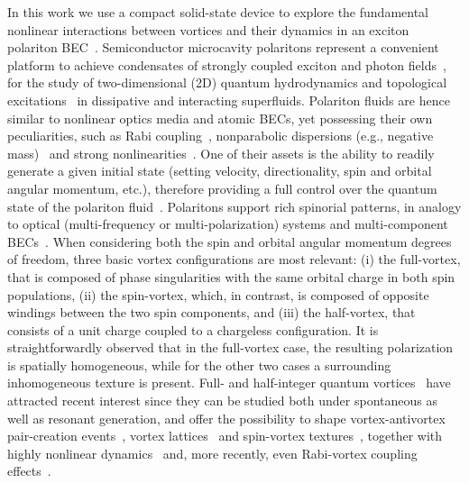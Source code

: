 \documentclass[aps,prb,twocolumn,superscriptaddress,nofootinbib]{revtex4}
\def\editr#1{#1}
\def\refer#1{#1}
\def\edstrike#1{}
\begin{document}
In this work we use a compact solid-state device to explore
the fundamental nonlinear interactions between
vortices and their dynamics in an exciton polariton BEC~\cite{sanvitto_road_2016,Byrnes2014}.
Semiconductor microcavity polaritons represent a convenient platform
to achieve condensates of
strongly coupled exciton and photon fields~\cite{Byrnes2014,Kasprzak2006},
for the study of two-dimensional (2D) quantum hydrodynamics
and topological excitations~\cite{Lagoudakis2008,Lagoudakis2009,roumpos2,Amo2009,Sanvitto2010,Amo2011,Manni2012} in dissipative and interacting superfluids.
%
Polariton fluids are hence similar
to nonlinear optics media and atomic BECs,
yet possessing their own peculiarities,
such as Rabi coupling~\cite{Dominici2014},
nonparabolic dispersions (e.g., negative mass)~\cite{gianfrate_superluminal_2018}
and strong nonlinearities~\cite{dominici_real-space_2015}.
One of their assets is the ability to readily
\edstrike{imprint} \refer{generate} a given initial state
(setting velocity, directionality, \editr{spin and orbital angular momentum}, etc.),
therefore providing a full control over the quantum state of the
polariton fluid~\cite{sanvitto_all-optical_2011}.
Polaritons support rich spinorial patterns, in analogy to optical
(multi-frequency or multi-polarization) systems and multi-component BECs~\cite{Kevrekidis2016140,kasamatsu_multi_review_2005}.
%
\editr{When considering both the spin and orbital angular momentum degrees of freedom,
three basic vortex configurations are most relevant:
%
(i) the full-vortex, that is composed of phase singularities
with the same orbital charge in both spin populations, 
%
(ii) the spin-vortex, which, in contrast, is composed of 
opposite windings between the two spin components, and
%
(iii) the half-vortex, that consists of a unit charge 
coupled to a chargeless configuration.
%
It is straightforwardly observed that in the full-vortex
case, the resulting polarization is spatially homogeneous,
while for the other two cases a surrounding inhomogeneous 
texture is present.}
%
Full- and half-integer quantum vortices~\cite{Liew2007,Rubo2007,Voronova2012} have attracted recent interest
since they can be studied both under spontaneous as well as resonant generation,
and offer the possibility to shape vortex-antivortex pair-creation events~\cite{sanvitto_all-optical_2011},
vortex lattices~\cite{Hivet2014,boulier_vortex_2015} and spin-vortex textures~\cite{Manni2013,Liu2015,donati_twist_2016},
together with highly nonlinear dynamics~\cite{dominici_vortex_2015} 
\editr{and, more recently, even Rabi-vortex coupling effects~\cite{dominici_ultrafast_2018}}.
\edstrike{Applications for ultra-sensitive gyroscopes~\cite{Franchetti2012} and
information processing~\cite{Sigurdsson2014} have been theoretically proposed for polariton vortices.}
\end{document}
